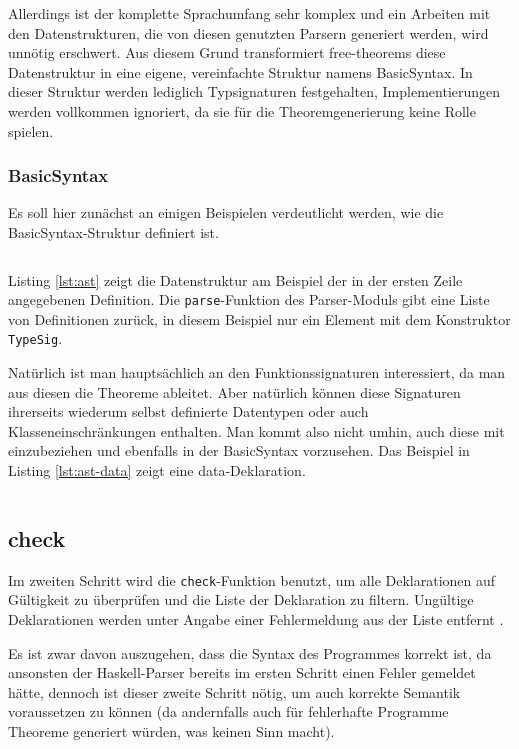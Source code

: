 \documentclass[11pt]{article} %
\begin{document}
Allerdings ist der komplette Sprachumfang sehr komplex und ein Arbeiten mit den Datenstrukturen, die von diesen genutzten Parsern generiert werden,
wird unnötig erschwert. Aus diesem Grund transformiert free-theorems diese Datenstruktur in eine eigene, vereinfachte Struktur namens BasicSyntax. In dieser Struktur
werden lediglich Typsignaturen festgehalten, Implementierungen werden vollkommen ignoriert, da sie für die Theoremgenerierung keine Rolle spielen.

\subsubsection{BasicSyntax}

Es soll hier zunächst an einigen Beispielen verdeutlicht werden, wie die BasicSyntax-Struktur definiert ist.

\inputminted[tabsize=2]{haskell}{ast.hs}

Listing \ref{lst:ast} zeigt die Datenstruktur am Beispiel der in der ersten Zeile angegebenen Definition. Die \texttt{parse}-Funktion des Parser-Moduls gibt eine Liste von Definitionen zurück, in diesem Beispiel nur ein Element mit dem Konstruktor \texttt{TypeSig}.

Natürlich ist man hauptsächlich an den Funktionssignaturen interessiert, da man aus diesen die Theoreme ableitet. Aber natürlich können diese Signaturen ihrerseits wiederum 
selbst definierte Datentypen oder auch Klasseneinschränkungen enthalten. Man kommt also nicht umhin, auch diese mit einzubeziehen und ebenfalls in der BasicSyntax vorzusehen.
Das Beispiel in Listing \ref{lst:ast-data} zeigt eine data-Deklaration.

\inputminted[tabsize=2]{haskell}{ast2.hs}

\subsection{check}
\label{sec:check}

Im zweiten Schritt wird die \texttt{check}-Funktion benutzt, um alle Deklarationen auf Gültigkeit zu überprüfen und die Liste der Deklaration zu filtern. Ungültige Deklarationen
werden unter Angabe einer Fehlermeldung aus der Liste entfernt \cite{freetheorems}.

Es ist zwar davon auszugehen, dass die Syntax des Programmes korrekt ist, da ansonsten der Haskell-Parser bereits im ersten Schritt einen Fehler gemeldet hätte, dennoch ist
dieser zweite Schritt nötig, um auch korrekte Semantik voraussetzen zu können  (da andernfalls auch für fehlerhafte Programme Theoreme generiert würden, was keinen Sinn macht).
\end{document}
